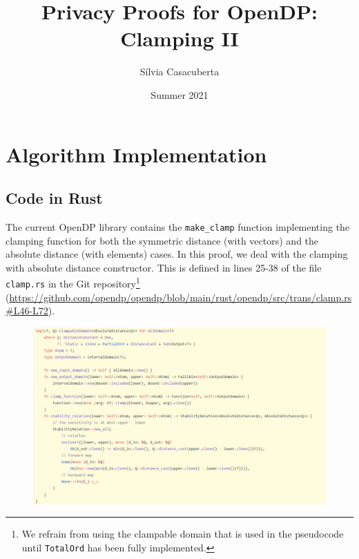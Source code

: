 \documentclass[11pt,a4paper]{article}
\title{Privacy Proofs for OpenDP: Clamping II}
\author{S\'ilvia Casacuberta}
\date{Summer 2021}
\theoremstyle{definition}
\begin{document}
\maketitle

\tableofcontents

\section{Algorithm Implementation}


\subsection{Code in Rust}
The current OpenDP library contains the \texttt{make\_clamp} function implementing the clamping function for both the symmetric distance (with vectors) and the absolute distance (with elements) cases. In this proof, we deal with the clamping with absolute distance constructor. This is defined in lines 25-38 of the file \texttt{clamp.rs} in the Git repository\footnote{We refrain from using the clampable domain that is used in the pseudocode until \texttt{TotalOrd} has been fully implemented.} (\url{https://github.com/opendp/opendp/blob/main/rust/opendp/src/trans/clamp.rs#L46-L72}).

\begin{figure}[ht]
    \includegraphics[width=15cm]{abs_clamp_rust.png}
    \centering
    \label{fig:code}
\end{figure}
\end{document}
